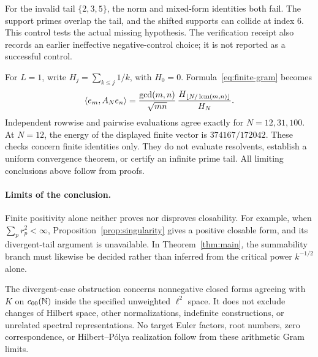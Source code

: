 For the invalid tail $\{2,3,5\}$, the norm and mixed-form identities
both fail. The support primes overlap the tail, and the shifted supports
can collide at index $6$. This control tests the actual missing
hypothesis. The verification receipt also records an earlier ineffective
negative-control choice; it is not reported as a successful control.

For $L=1$, write $H_j=\sum_{k\le j}1/k$, with $H_0=0$.
Formula~\eqref{eq:finite-gram} becomes
\[
 \langle e_m,A_Ne_n\rangle
 =\frac{\gcd(m,n)}{\sqrt{mn}}\,
   \frac{H_{\lfloor N/\operatorname{lcm}(m,n)\rfloor}}{H_N}.
\]
Independent rowwise and pairwise evaluations agree exactly for
$N=12,31,100$. At $N=12$, the energy of the displayed finite vector
is $374167/172042$.
These checks concern finite identities only. They do not evaluate
resolvents, establish a uniform convergence theorem, or certify an
infinite prime tail. All limiting conclusions above follow from proofs.

\paragraph{Limits of the conclusion.}
Finite positivity alone neither proves nor disproves closability.
For example, when $\sum_p r_p^2<\infty$,
Proposition~\ref{prop:singularity} gives a positive closable form,
and its divergent-tail argument is unavailable.
In Theorem~\ref{thm:main}, the summability branch must likewise be
decided rather than inferred from the critical power $k^{-1/2}$ alone.

The divergent-case obstruction concerns nonnegative closed forms
agreeing with $K$ on $c_{00}(\mathbb{N})$ inside the specified unweighted $\ell^2$ space.
It does not exclude changes of Hilbert space, other normalizations,
indefinite constructions, or unrelated spectral representations.
No target Euler factors, root numbers, zero correspondence, or
Hilbert--P\'olya realization follow from these arithmetic Gram limits.
